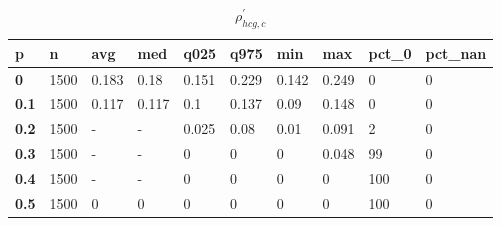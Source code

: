 \begin{table}[h]
 \centering 
\footnotesize
\caption{$\rho_{hcg,c}^\prime $}
\label{tab:alphahcgc}
\begin{tabular}[h]{|l|l|l|l|l|l|l|l|l|l|
    } \hline
\textbf{ p} & \textbf{ n} & \textbf{ avg} & \textbf{ med} & \textbf{ q025} & \textbf{ q975} & \textbf{ min} & \textbf{ max} & \textbf{ pct\_0} & \textbf{ pct\_nan}
    \\ \hline
  \textbf{  0} & 1500 & 0.183 &  0.18 & 0.151 & 0.229 & 0.142 & 0.249 &   0 & 0
    \\ \hline
  \textbf{0.1} & 1500 & 0.117 & 0.117 &   0.1 & 0.137 &  0.09 & 0.148 &   0 & 0
    \\ \hline
  \textbf{0.2} & 1500 & - & - & 0.025 &  0.08 &  0.01 & 0.091 &   2 & 0
    \\ \hline
  \textbf{0.3} & 1500 & - & - &     0 &     0 &     0 & 0.048 &  99 & 0
    \\ \hline
  \textbf{0.4} & 1500 & - & - &     0 &     0 &     0 &     0 & 100 & 0
    \\ \hline
  \textbf{0.5} & 1500 &     0 &     0 &     0 &     0 &     0 &     0 & 100 & 0
    \\ \hline
 \end{tabular}
 \end{table}

